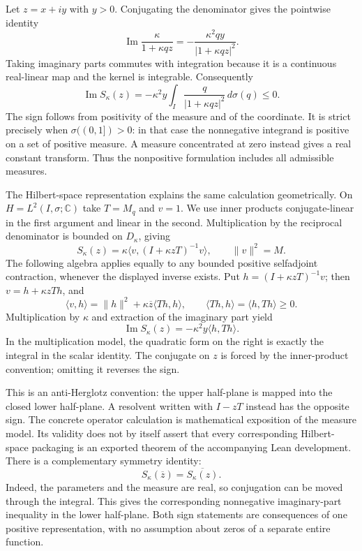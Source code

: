 \label{res:imaginary-part}
Let $z=x+iy$ with $y>0$. Conjugating the denominator gives the
pointwise identity
\[
 \operatorname{Im}\frac{\kappa}{1+\kappa qz}
 =-\frac{\kappa^2qy}{|1+\kappa qz|^2}.
\]
Taking imaginary parts commutes with integration because it is a
continuous real-linear map and the kernel is integrable. Consequently
\[
 \operatorname{Im}S_\kappa(z)
 =-\kappa^2y\int_I\frac{q}{|1+\kappa qz|^2}\,d\sigma(q)\le0.
\]
The sign follows from positivity of the measure and of the coordinate.
It is strict precisely when $\sigma((0,1])>0$: in that case the
nonnegative integrand is positive on a set of positive measure. A
measure concentrated at zero instead gives a real constant transform.
Thus the nonpositive formulation includes all admissible measures.

The Hilbert-space representation explains the same calculation
geometrically. On $H=L^2(I,\sigma;\mathbb C)$ take $T=M_q$ and $v=1$.
We use inner products conjugate-linear in the first argument and linear
in the second. Multiplication by the reciprocal denominator is bounded
on $D_\kappa$, giving
\[
 S_\kappa(z)=\kappa\langle v,(I+\kappa zT)^{-1}v\rangle,
 \qquad \|v\|^2=M.
\]
The following algebra applies equally to any bounded positive
selfadjoint contraction, whenever the displayed inverse exists.
Put $h=(I+\kappa zT)^{-1}v$; then $v=h+\kappa zTh$, and
\[
 \langle v,h\rangle
 =\|h\|^2+\kappa\overline z\langle Th,h\rangle,
 \qquad \langle Th,h\rangle=\langle h,Th\rangle\ge0.
\]
Multiplication by $\kappa$ and extraction of the imaginary part yield
\[
 \operatorname{Im}S_\kappa(z)
 =-\kappa^2y\langle h,Th\rangle.
\]
In the multiplication model, the quadratic form on the right is
exactly the integral in the scalar identity. The conjugate on $z$ is
forced by the inner-product convention; omitting it reverses the sign.

This is an anti-Herglotz convention: the upper half-plane is mapped
into the closed lower half-plane. A resolvent written with $I-zT$
instead has the opposite sign. The concrete operator calculation is
mathematical exposition of the measure model. Its validity does not
by itself assert that every corresponding Hilbert-space packaging is
an exported theorem of the accompanying Lean development.
There is a complementary symmetry identity:
\[
 S_\kappa(\overline z)=\overline{S_\kappa(z)}.
\]
Indeed, the parameters and the measure are real, so conjugation can
be moved through the integral. This gives the corresponding nonnegative
imaginary-part inequality in the lower half-plane. Both sign statements
are consequences of one positive representation, with no assumption
about zeros of a separate entire function.

